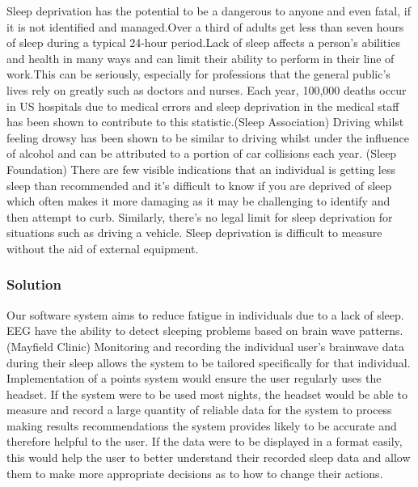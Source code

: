 Sleep deprivation has the potential to be a dangerous to anyone and
even fatal, if it is not identified and managed.Over a third of adults get less than seven hours
of sleep during a typical 24-hour period.Lack of sleep affects a person's abilities and health
in many ways and can limit their ability to perform in their line of work.This can be seriously,
especially for professions that the general public’s lives rely on greatly such as doctors and nurses.
Each year, 100,000 deaths occur in US hospitals due to medical errors and sleep deprivation in the
medical staff has been shown to contribute to this statistic.(Sleep Association) Driving whilst feeling drowsy
has been shown to be similar to driving whilst under the influence of alcohol and can be attributed to a
portion of car collisions each year. (Sleep Foundation) There are few visible indications that an individual
is getting less sleep than recommended and it’s difficult to know if you are deprived of sleep
which often makes it more damaging as it may be challenging to identify and then attempt to curb.
Similarly, there’s no legal limit for sleep deprivation for situations such as driving a vehicle.
Sleep deprivation is difficult to measure without the aid of external equipment.

\subsubsection{Solution}

Our software system aims to reduce fatigue in individuals due to a lack of sleep.
 EEG have the ability to detect sleeping problems based on brain wave patterns. (Mayfield Clinic)
 Monitoring and recording the individual user’s brainwave data during their sleep allows the system
 to be tailored specifically for that individual. Implementation of a points system would ensure the
 user regularly uses the headset. If the system were to be used most nights, the headset would be able
 to measure and record a large quantity of reliable data for the system to process making results
 recommendations the system provides likely to be accurate and therefore helpful to the user.
 If the data were to be displayed in a format easily, this would help the user
 to better understand their recorded sleep data and allow them to make more appropriate decisions as to
 how to change their actions.
